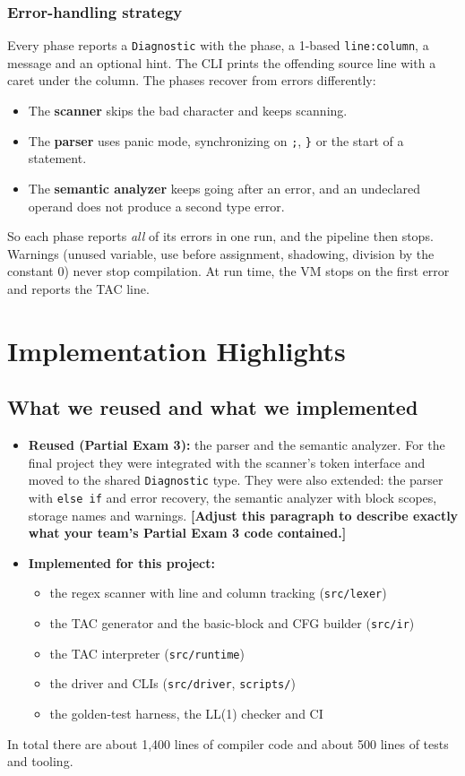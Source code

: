 \documentclass[11pt,letterpaper]{article}
\newcommand{\fillin}[1]{\textcolor{fill}{\textbf{[#1]}}}   %
\newcommand{\code}[1]{\texttt{#1}}
\begin{document}
\subsubsection*{Error-handling strategy}
Every phase reports a \code{Diagnostic} with the phase, a 1-based \code{line:column}, a message and an optional hint. The CLI prints the offending source line with a caret under the column. The phases recover from errors differently:
\begin{itemize}
  \item The \textbf{scanner} skips the bad character and keeps scanning.
  \item The \textbf{parser} uses panic mode, synchronizing on \code{;}, \code{\}} or the start of a statement.
  \item The \textbf{semantic analyzer} keeps going after an error, and an undeclared operand does not produce a second type error.
\end{itemize}
So each phase reports \emph{all} of its errors in one run, and the pipeline then stops. Warnings (unused variable, use before assignment, shadowing, division by the constant 0) never stop compilation. At run time, the VM stops on the first error and reports the TAC line.

\section{Implementation Highlights}

\subsection{What we reused and what we implemented}
\begin{itemize}
  \item \textbf{Reused (Partial Exam 3):} the parser and the semantic analyzer. For the final project they were integrated with the scanner's token interface and moved to the shared \code{Diagnostic} type. They were also extended: the parser with \code{else if} and error recovery, the semantic analyzer with block scopes, storage names and warnings. \fillin{Adjust this paragraph to describe exactly what your team's Partial Exam 3 code contained.}
  \item \textbf{Implemented for this project:}
  \begin{itemize}
    \item the regex scanner with line and column tracking (\code{src/lexer})
    \item the TAC generator and the basic-block and CFG builder (\code{src/ir})
    \item the TAC interpreter (\code{src/runtime})
    \item the driver and CLIs (\code{src/driver}, \code{scripts/})
    \item the golden-test harness, the LL(1) checker and CI
  \end{itemize}
\end{itemize}
In total there are about 1,400 lines of compiler code and about 500 lines of tests and tooling.
\end{document}
